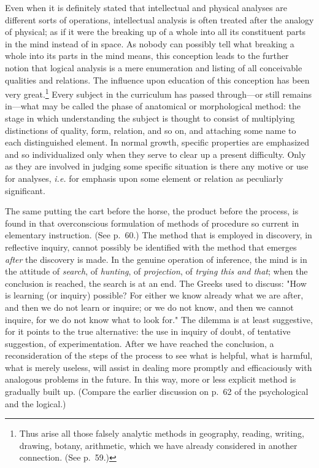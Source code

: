 \documentclass[showtrims,ustradepaper]{memoir}
\begin{document}


Even when it is definitely stated that intellectual and physical
analyses are different sorts of operations, intellectual analysis is
often treated after the analogy of physical; as if it were the breaking
up of a whole into all its constituent parts in the mind instead of in
space. As nobody can possibly tell what breaking a whole into its parts
in the mind means, this conception leads to the further notion that
logical analysis is a mere enumeration and listing of all conceivable
qualities and
relations.
The influence upon education of this conception has been very
great.\footnote{
Thus arise all those falsely analytic methods in geography, reading,
writing, drawing, botany, arithmetic, which we have already considered
in another connection. (See p.\ 59.)
}
Every subject in the curriculum has passed through---or still remains
in---what may be called the phase of anatomical or morphological method:
the stage in which understanding the subject is thought to consist of
multiplying distinctions of quality, form, relation, and so on, and
attaching some name to each distinguished element. In normal growth,
specific properties are emphasized and so individualized only when they
serve to clear up a present difficulty. Only as they are involved in
judging some specific situation is there any motive or use for analyses,
\emph{i.e.} for emphasis upon some element or relation as peculiarly
significant.


The same putting the cart before the horse, the product before the
process, is found in that overconscious formulation of methods of
procedure so current in elementary instruction. (See p.\ 60.) The method
that is employed in discovery, in reflective inquiry, cannot possibly be
identified with the method that emerges \emph{after} the discovery is
made. In the genuine operation of inference, the mind is in the attitude
of \emph{search}, of \emph{hunting}, of \emph{projection}, of
\emph{trying this and that}; when the conclusion is reached, the search
is at an end. The Greeks used to discuss: "How is learning (or inquiry)
possible? For either we know already what we are after, and then we do
not learn or inquire; or we do not know, and then we cannot inquire, for
we do not know what to look for." The dilemma is at least suggestive,
for it points to the true alternative: the use in inquiry of doubt, of
tentative suggestion, of
experimentation.
After we have reached the conclusion, a reconsideration of the steps of
the process to see what is helpful, what is harmful, what is merely
useless, will assist in dealing more promptly and efficaciously with
analogous problems in the future. In this way, more or less explicit
method is gradually built up. (Compare the earlier discussion on p.\ 62
of the psychological and the logical.)
\end{document}
